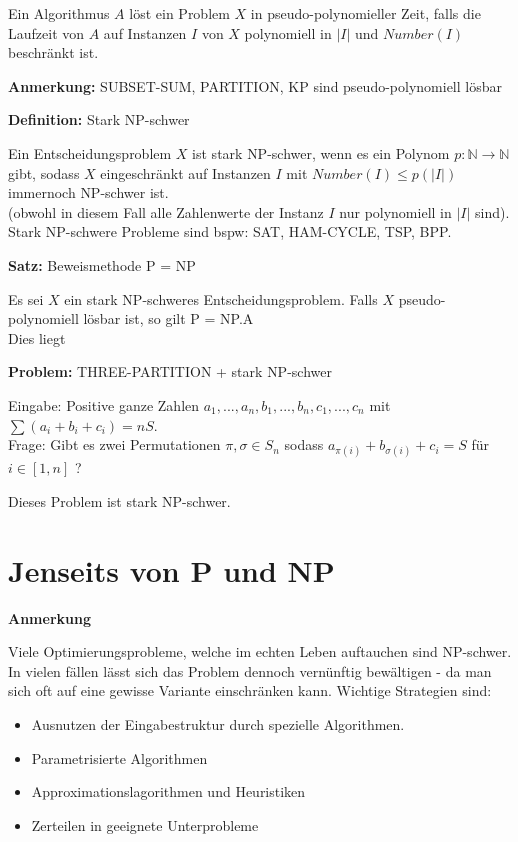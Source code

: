 \documentclass[a4paper,graphics,11pt]{article}
\begin{document}
Ein Algorithmus $A$ löst ein Problem $X$ in pseudo-polynomieller Zeit, falls die Laufzeit von
$A$ auf Instanzen $I$ von $X$ polynomiell in $|I|$ und $Number(I)$ beschränkt ist.

\strut

\textbf{Anmerkung:} SUBSET-SUM, PARTITION, KP sind pseudo-polynomiell lösbar

\strut

\textbf{Definition:} Stark \textsf{NP}-schwer

Ein Entscheidungsproblem $X$ ist stark \textsf{NP}-schwer, wenn es ein Polynom $p : \mathbb{N}\to \mathbb{N}$
gibt, sodass $X$ eingeschränkt auf Instanzen $I$ mit $Number(I) \leq p(|I|)$ immernoch \textsf{NP}-schwer ist.\\
(obwohl in diesem Fall alle Zahlenwerte der Instanz $I$ nur polynomiell in $|I|$ sind).\\
Stark \textsf{NP}-schwere Probleme sind bspw: SAT, HAM-CYCLE, TSP, BPP.

\strut

\textbf{Satz:} Beweismethode \textsf{P = NP}

Es sei $X$ ein stark \textsf{NP}-schweres Entscheidungsproblem. Falls $X$ pseudo-polynomiell lösbar ist,
so gilt \textsf{P = NP}.A\\
Dies liegt

\strut

\textbf{Problem:} THREE-PARTITION + stark \textsf{NP}-schwer

Eingabe: Positive ganze Zahlen $a_1,...,a_n,b_1,...,b_n,c_1,...,c_n$ mit $\sum (a_i+b_i+c_i) = nS$.\\[5pt]
Frage: Gibt es zwei Permutationen $\pi,\sigma \in S_n$ sodass $a_{\pi(i)} + b_{\sigma(i)} + c_i = S$
für $i \in [1,n]$ ?

Dieses Problem ist stark \textsf{NP}-schwer.

\newpage

\section{Jenseits von \textsf{P} und \textsf{NP}}

\textbf{Anmerkung}

Viele Optimierungsprobleme, welche im echten Leben auftauchen sind \textsf{NP}-schwer. In vielen
fällen lässt sich das Problem dennoch vernünftig bewältigen - da man sich oft auf eine gewisse Variante
einschränken kann. Wichtige Strategien sind:
\begin{itemize}
    \item Ausnutzen der Eingabestruktur durch spezielle Algorithmen.
    \item Parametrisierte Algorithmen
    \item Approximationslagorithmen und Heuristiken
    \item Zerteilen in geeignete Unterprobleme
\end{itemize}
\end{document}
